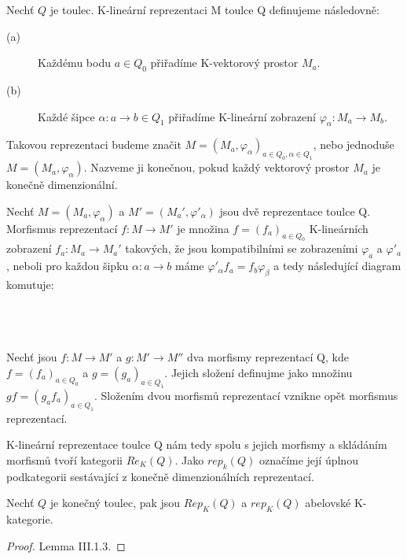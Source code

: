     \begin{dfn}
      Nechť $Q$ je toulec. K-lineární reprezentaci M toulce Q definujeme 
      následovně:
      \begin{description}
        \item[(a)] Každému bodu $a\in Q_0$ přiřadíme K-vektorový prostor $M_a$. 
        \item[(b)] Každé šipce $\alpha: a \rightarrow b \in Q_1$ přiřadíme 
        K-lineární zobrazení $\varphi_\alpha:M_a\rightarrow M_b$. 
      \end{description}
      Takovou reprezentaci budeme značit $M=(M_a,\varphi_\alpha)_{a\in Q_0,\alpha\in 
      Q_1}$, nebo jednoduše $M=(M_a,\varphi_\alpha)$. Nazveme ji konečnou, pokud 
      každý vektorový prostor $M_a$  je konečně dimenzionální.
      
      Nechť $M=(M_a,\varphi_\alpha)$ a $M'=(M_a',\varphi'_\alpha)$ jsou dvě 
      reprezentace toulce Q. Morfismus reprezentací $f:M\rightarrow M'$ je 
      množina $f=(f_a)_{a\in Q_0}$ K-lineárních zobrazení $f_a:M_a\rightarrow M_a'$ 
      takových, že jsou kompatibilními se zobrazeními $\varphi_a$ a 
      $\varphi'_a$, neboli pro každou šipku $\alpha: a\rightarrow b$ máme 
      $\varphi'_\alpha f_a=f_b\varphi_\beta$ a tedy následující diagram komutuje: \\\\
      \centerline{}\\\\
      
      Nechť jsou $f:M\rightarrow M'$ a  $g:M'\rightarrow M''$ dva morfismy 
      reprezentací Q, kde $f=(f_a)_{a\in Q_0}$ a $g=(g_a)_{a\in Q_1}$. Jejich 
      složení definujme jako množinu $gf=(g_af_a)_{a\in Q_1}$. Složením dvou morfismů 
      reprezentací vznikne opět morfismus reprezentací. 
      
      K-lineární reprezentace toulce Q nám tedy spolu s jejich morfismy a skládáním morfismů 
      tvoří kategorii $Re_K(Q)$. Jako $rep_k(Q)$ označíme její úplnou podkategorii 
      sestávající z konečně dimenzionálních reprezentací.
    \end{dfn}
    
    \begin{lem}
      Nechť $Q$ je konečný toulec, pak jsou $Rep_K(Q)$ a $rep_K(Q)$ abelovské 
      K-kategorie.
    \end{lem}
    \begin{proof}
      \cite{1} Lemma III.1.3.
    \end{proof}
    
